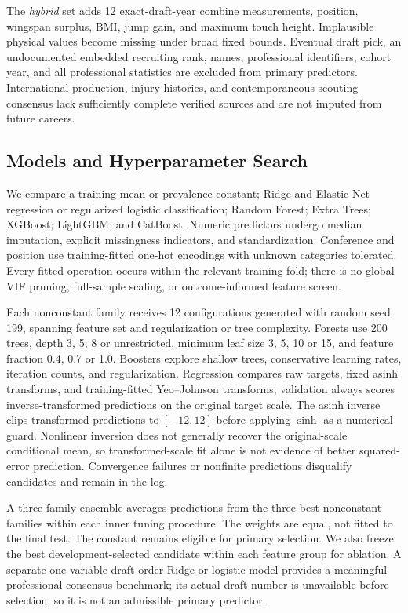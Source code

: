 \documentclass[11pt]{article}
\begin{document}
The \emph{hybrid} set adds 12 exact-draft-year combine measurements, position, wingspan surplus, BMI, jump gain, and maximum touch height. Implausible physical values become missing under broad fixed bounds. Eventual draft pick, an undocumented embedded recruiting rank, names, professional identifiers, cohort year, and all professional statistics are excluded from primary predictors. International production, injury histories, and contemporaneous scouting consensus lack sufficiently complete verified sources and are not imputed from future careers.

\subsection{Models and Hyperparameter Search}
We compare a training mean or prevalence constant; Ridge and Elastic Net regression or regularized logistic classification; Random Forest; Extra Trees; XGBoost; LightGBM; and CatBoost. Numeric predictors undergo median imputation, explicit missingness indicators, and standardization. Conference and position use training-fitted one-hot encodings with unknown categories tolerated. Every fitted operation occurs within the relevant training fold; there is no global VIF pruning, full-sample scaling, or outcome-informed feature screen.

Each nonconstant family receives 12 configurations generated with random seed 199, spanning feature set and regularization or tree complexity. Forests use 200 trees, depth 3, 5, 8 or unrestricted, minimum leaf size 3, 5, 10 or 15, and feature fraction 0.4, 0.7 or 1.0. Boosters explore shallow trees, conservative learning rates, iteration counts, and regularization. Regression compares raw targets, fixed asinh transforms, and training-fitted Yeo--Johnson transforms; validation always scores inverse-transformed predictions on the original target scale. The asinh inverse clips transformed predictions to $[-12,12]$ before applying $\sinh$ as a numerical guard. Nonlinear inversion does not generally recover the original-scale conditional mean, so transformed-scale fit alone is not evidence of better squared-error prediction. Convergence failures or nonfinite predictions disqualify candidates and remain in the log.

A three-family ensemble averages predictions from the three best nonconstant families within each inner tuning procedure. The weights are equal, not fitted to the final test. The constant remains eligible for primary selection. We also freeze the best development-selected candidate within each feature group for ablation. A separate one-variable draft-order Ridge or logistic model provides a meaningful professional-consensus benchmark; its actual draft number is unavailable before selection, so it is not an admissible primary predictor.
\end{document}
